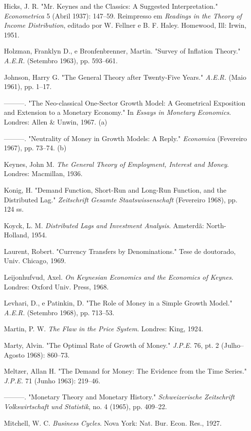 \documentclass[12pt]{article}
\begin{document}
Hicks, J. R. "Mr. Keynes and the Classics: A Suggested Interpretation." \textit{Econometrica} 5 (Abril 1937): 147–59. Reimpresso em \textit{Readings in the Theory of Income Distribution}, editado por W. Fellner e B. F. Haley. Homewood, Ill: Irwin, 1951.

Holzman, Franklyn D., e Bronfenbrenner, Martin. "Survey of Inflation Theory." \textit{A.E.R.} (Setembro 1963), pp. 593–661.

Johnson, Harry G. "The General Theory after Twenty-Five Years." \textit{A.E.R.} (Maio 1961), pp. 1–17.

———. "The Neo-classical One-Sector Growth Model: A Geometrical Exposition and Extension to a Monetary Economy." In \textit{Essays in Monetary Economics}. Londres: Allen & Unwin, 1967. (a)

———. "Neutrality of Money in Growth Models: A Reply." \textit{Economica} (Fevereiro 1967), pp. 73–74. (b)

Keynes, John M. \textit{The General Theory of Employment, Interest and Money}. Londres: Macmillan, 1936.

Konig, H. "Demand Function, Short-Run and Long-Run Function, and the Distributed Lag." \textit{Zeitschrift Gesamte Staatswissenschaft} (Fevereiro 1968), pp. 124 ss.

Koyck, L. M. \textit{Distributed Lags and Investment Analysis}. Amsterdã: North-Holland, 1954.

Laurent, Robert. "Currency Transfers by Denominations." Tese de doutorado, Univ. Chicago, 1969.

Leijonhufvud, Axel. \textit{On Keynesian Economics and the Economics of Keynes}. Londres: Oxford Univ. Press, 1968.

Levhari, D., e Patinkin, D. "The Role of Money in a Simple Growth Model." \textit{A.E.R.} (Setembro 1968), pp. 713–53.

Martin, P. W. \textit{The Flaw in the Price System}. Londres: King, 1924.

Marty, Alvin. "The Optimal Rate of Growth of Money." \textit{J.P.E.} 76, pt. 2 (Julho–Agosto 1968): 860–73.

Meltzer, Allan H. "The Demand for Money: The Evidence from the Time Series." \textit{J.P.E.} 71 (Junho 1963): 219–46.

———. "Monetary Theory and Monetary History." \textit{Schweizerische Zeitschrift Volkswirtschaft und Statistik}, no. 4 (1965), pp. 409–22.

Mitchell, W. C. \textit{Business Cycles}. Nova York: Nat. Bur. Econ. Res., 1927.
\end{document}
